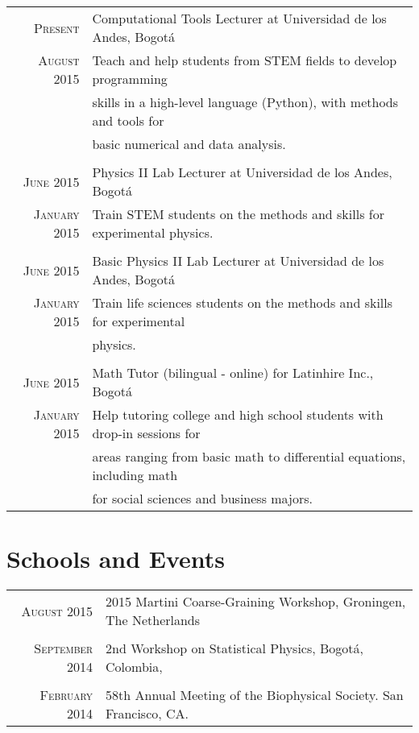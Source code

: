 \documentclass[a4paper,10pt]{article} %
\begin{document}
\begin{longtable}{rl}

\textsc{Present} & Computational Tools Lecturer at Universidad de los Andes, Bogot\'a  \\ 
\textsc{August 2015} & Teach and help students from STEM fields to develop programming  \\ & skills in a high-level language (Python), with methods and tools for  \\ & basic numerical and data analysis. \\
\\

\textsc{June 2015} & Physics II Lab Lecturer at Universidad de los Andes, Bogot\'a  \\ 
\textsc{January 2015} & Train STEM students on the methods and skills for experimental physics.\\
\\

\textsc{June 2015} & Basic Physics II Lab Lecturer at Universidad de los Andes, Bogot\'a \\ 
\textsc{January 2015} & Train life sciences students on the methods and skills for experimental  \\ & physics.\\
\\

\textsc{June 2015} & Math Tutor (bilingual - online) for Latinhire Inc., Bogot\'a\\ 
\textsc{January 2015} & Help tutoring college and high school students with drop-in sessions for \\ & areas ranging from basic math to differential equations, including math  \\ & for social sciences and business majors. 

\end{longtable}


\color{OrangeRed}
\section{Schools and Events}
\color{black}

\begin{tabular}{rl}

\textsc{August 2015} & 2015 Martini Coarse-Graining Workshop, Groningen, The Netherlands \\
&\\

\textsc{September 2014} &  2nd Workshop on Statistical Physics, Bogotá, Colombia, \\
&\\

\textsc{February 2014} &  58th Annual Meeting of the Biophysical Society. San Francisco, CA. \\

\end{tabular}
\end{document}
